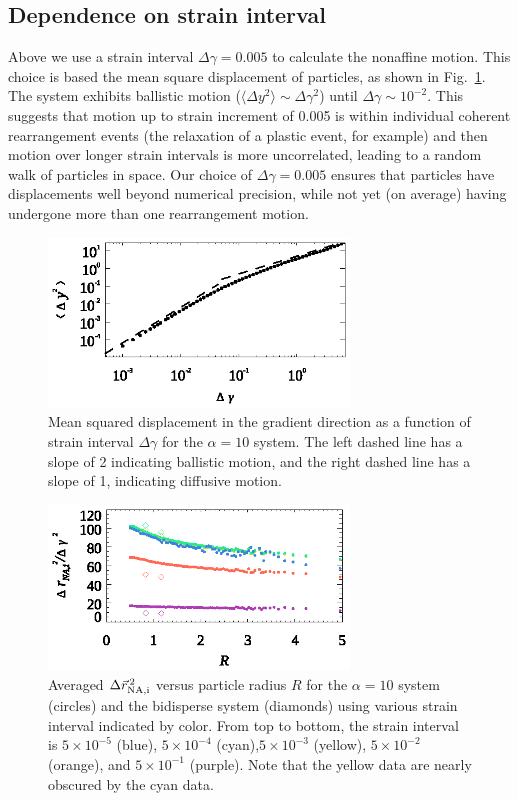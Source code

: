 \documentclass[%
 reprint,
 amsmath,amssymb,
 aps,
]{revtex4-2}
\begin{document}
\subsection{Dependence on strain interval}

Above we use a strain interval $\Delta \gamma= 0.005$ to calculate the nonaffine motion.  This choice is based the mean square displacement of particles, as shown in Fig.~\ref{fig:msd}.  The system exhibits ballistic motion ($\langle \Delta y^2 \rangle \sim \Delta \gamma^2$) until $\Delta \gamma \sim 10^{-2}$.  This suggests that motion up to strain increment of 0.005 is within individual coherent rearrangement events (the relaxation of a plastic event, for example) and then motion over longer strain intervals is more uncorrelated, leading to a random walk of particles in space.  Our choice of $\Delta \gamma= 0.005$ ensures that particles have displacements well beyond numerical precision, while not yet (on average) having undergone more than one rearrangement motion.

\begin{figure}
    \centering
    \includegraphics[width=8cm]{msd_y_noboundary_exp10_100622.eps}
    \caption{Mean squared displacement in the gradient direction as a function of strain interval $\Delta \gamma$ for the $\alpha=10$ system. The left dashed line has a slope of 2 indicating ballistic motion, and the right dashed line has a slope of 1, indicating diffusive motion.}
    \label{fig:msd}
\end{figure}

\begin{figure}
    \centering
    \includegraphics[width=8cm]{ndr_r_strain_101023.eps}
    \caption{Averaged $\Delta \vec{r}_{\rm NA,i}^{\,2}$ versus particle radius $R$ for the $\alpha=10$ system (circles) and the bidisperse system (diamonds) using various strain interval indicated by color.  From top to bottom, the strain interval is $5\times 10^{-5}$ (blue), $5\times 10^{-4}$ (cyan),$5\times 10^{-3}$ (yellow), $5\times 10^{-2}$ (orange), and $5\times 10^{-1}$ (purple).  Note that the yellow data are nearly obscured by the cyan data.}
    \label{fig:strainintervalcheck}
\end{figure}
\end{document}
